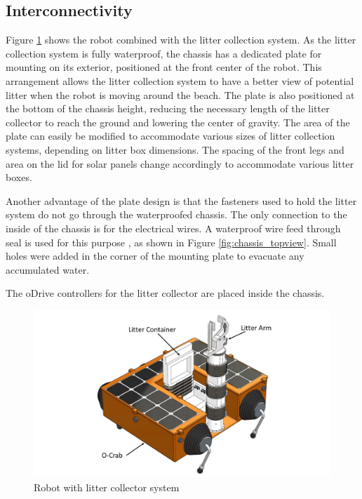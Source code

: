 \subsection{Interconnectivity} \label{subsec:interconnectivity}

Figure \ref{fig:interconnectivity} shows the robot combined with the litter collection system. As the litter collection system is fully waterproof, the chassis has a dedicated plate for mounting on its exterior, positioned at the front center of the robot. This arrangement allows the litter collection system to have a better view of potential litter when the robot is moving around the beach. The plate is also positioned at the bottom of the chassis height, reducing the necessary length of the litter collector to reach the ground and lowering the center of gravity. The area of the plate can easily be modified to accommodate various sizes of litter collection systems, depending on litter box dimensions. The spacing of the front legs and area on the lid for solar panels change accordingly to accommodate various litter boxes.

Another advantage of the plate design is that the fasteners used to hold the litter system do not go through the waterproofed chassis. The only connection to the inside of the chassis is for the electrical wires. A waterproof wire feed through seal is used for this purpose \cite{mcmaster-carr_plastic_2019}, as shown in Figure \ref{fig:chassis_topview}. Small holes were added in the corner of the mounting plate to evacuate any accumulated water.

The oDrive controllers for the litter collector are placed inside the chassis.

\begin{figure}
    \centering
    \includegraphics[width=\textwidth]{2_ProposedDesign/img/IsoWithArmA.jpg}
    \caption{Robot with litter collector system}
    \label{fig:interconnectivity}
\end{figure}
